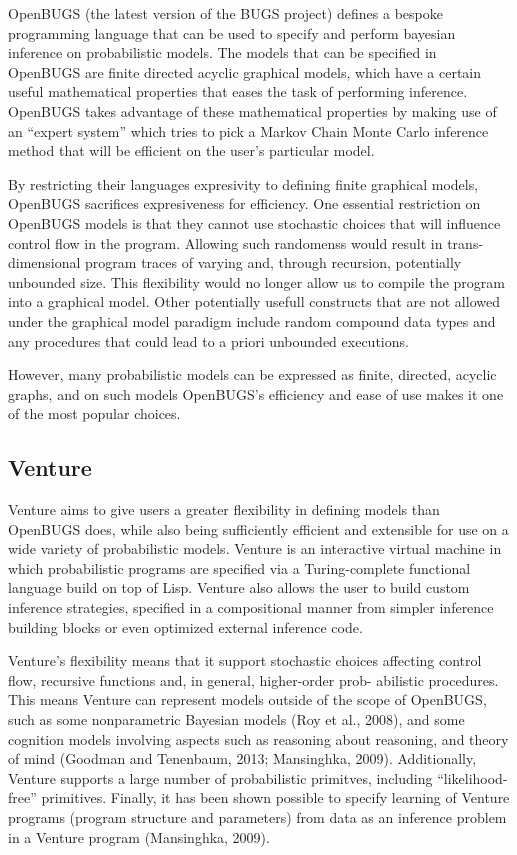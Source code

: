OpenBUGS (the latest version of the BUGS project) defines a bespoke programming language that can be used to specify and perform bayesian inference on probabilistic models. The models that can be specified in OpenBUGS are finite directed acyclic graphical models, which have a certain useful mathematical properties that eases the task of performing inference. OpenBUGS takes advantage of these mathematical properties by making use of an ``expert system'' which tries to pick a Markov Chain Monte Carlo inference method that will be efficient on the user's particular model.

By restricting their languages expresivity to defining finite graphical models, OpenBUGS sacrifices expresiveness for efficiency. 
One essential restriction on OpenBUGS models is that they cannot use stochastic choices that will influence control flow in the program. Allowing such randomenss would result in trans-dimensional program traces of varying and, through recursion, potentially unbounded size. This flexibility would no longer allow us to compile the program into a graphical model. Other potentially usefull constructs that are not allowed under the graphical model paradigm include random compound data types and any procedures that could lead to a priori unbounded executions.

However, many probabilistic models can be expressed as finite, directed, acyclic graphs, and on such models OpenBUGS's efficiency and ease of use makes it one of the most popular choices.

\subsection{Venture}

Venture aims to give users a greater flexibility in defining models than OpenBUGS does, while also being sufficiently efficient and extensible for use on a wide variety of probabilistic models. Venture is an interactive virtual machine in which probabilistic programs are specified via a Turing-complete functional language build on top of Lisp. Venture also allows the user to build custom inference strategies, specified in a compositional manner from simpler inference building blocks or even optimized external inference code. 

Venture's flexibility means that it support stochastic choices affecting control flow, recursive functions and, in general, higher-order prob-
abilistic procedures. This means Venture can represent models outside of the scope of OpenBUGS, such as some nonparametric Bayesian models (Roy et al., 2008), and some cognition models involving aspects such as reasoning about reasoning, and theory of mind (Goodman and Tenenbaum, 2013; Mansinghka, 2009). Additionally, Venture supports a large number of probabilistic primitves, including ``likelihood-free''
primitives. Finally, it has been shown possible to specify learning of Venture programs (program structure and parameters) from data as an inference problem in a Venture program (Mansinghka, 2009).

